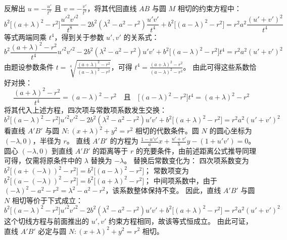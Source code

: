 \begin{solution}
反解出 $u = -\frac{u'}{t^2}$ 且 $v = -\frac{v'}{t^2}$，将其代回直线 $AB$ 与圆 $M$ 相切的约束方程中：
\[ b^2 \big[ (a+\lambda)^2 - r^2 \big] \frac{u'^2 v'^2}{t^8} - 2b^2(\lambda^2-a^2-r^2) \frac{u'v'}{t^4} + b^2 \big[ (a-\lambda)^2 - r^2 \big] = r^2 a^2 \frac{(u'+v')^2}{t^4} \]
等式两端同乘 $t^4$，得到关于参数 $u', v'$ 的关系式：
\[ b^2 \frac{(a+\lambda)^2 - r^2}{t^4} u'^2 v'^2 - 2b^2(\lambda^2-a^2-r^2) u'v' + b^2 \big[ (a-\lambda)^2 - r^2 \big] t^4 = r^2 a^2 (u'+v')^2 \]
由题设参数条件 $t = \sqrt[4]{\frac{(a+\lambda)^2 - r^2}{(a-\lambda)^2 - r^2}}$，可得 $t^4 = \frac{(a+\lambda)^2 - r^2}{(a-\lambda)^2 - r^2}$。
由此可得这些系数恰好对换：
\[ \frac{(a+\lambda)^2 - r^2}{t^4} = (a-\lambda)^2 - r^2 \quad \text{且} \quad \big[ (a-\lambda)^2 - r^2 \big] t^4 = (a+\lambda)^2 - r^2 \]
将其代入上述方程，四次项与常数项系数发生交换：
\[ b^2 \big[ (a-\lambda)^2 - r^2 \big] u'^2 v'^2 - 2b^2(\lambda^2-a^2-r^2) u'v' + b^2 \big[ (a+\lambda)^2 - r^2 \big] = r^2 a^2 (u'+v')^2 \]
看直线 $A'B'$ 与圆 $N: (x + \lambda)^2 + y^2 = r^2$ 相切的代数条件。圆 $N$ 的圆心坐标为 $(-\lambda, 0)$，半径为 $r$。
直线 $A'B'$ 的方程为 $\frac{1-u'v'}{a} x + \frac{u'+v'}{b} y - (1+u'v') = 0$。
圆心 $(-\lambda, 0)$ 到直线 $A'B'$ 的距离等于 $r$ 的充要条件，由前述距离公式推导同理可得，仅需将原条件中的 $\lambda$ 替换为 $-\lambda$。
替换后常数变化为：
四次项系数变为 $b^2 \big[ (a+(-\lambda))^2 - r^2 \big] = b^2 \big[ (a-\lambda)^2 - r^2 \big]$；
常数项变为 $b^2 \big[ (a-(-\lambda))^2 - r^2 \big] = b^2 \big[ (a+\lambda)^2 - r^2 \big]$；
中间项系数中，由于 $(-\lambda)^2 - a^2 - r^2 = \lambda^2 - a^2 - r^2$，该系数整体保持不变。
因此，直线 $A'B'$ 与圆 $N$ 相切等价于下式成立：
\[ b^2 \big[ (a-\lambda)^2 - r^2 \big] u'^2 v'^2 - 2b^2(\lambda^2-a^2-r^2) u'v' + b^2 \big[ (a+\lambda)^2 - r^2 \big] = r^2 a^2 (u'+v')^2 \]
这个切线方程与前面推出的 $u',v'$ 约束方程相同，故该等式恒成立。
由此可证，直线 $A'B'$ 必定与圆 $N: (x + \lambda)^2 + y^2 = r^2$ 相切。
\end{solution}

